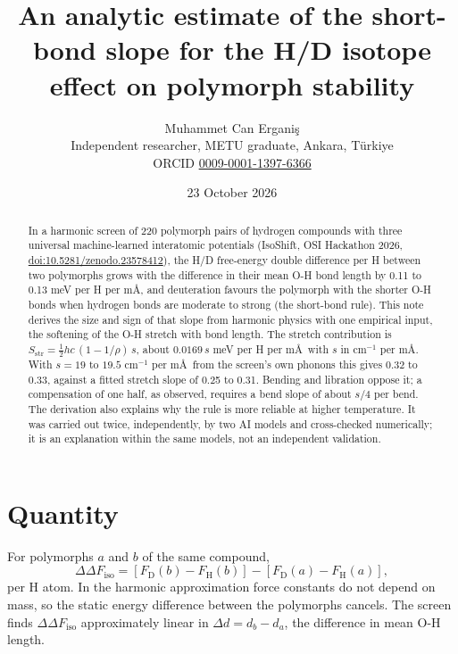 \documentclass[11pt,a4paper]{article}
\title{An analytic estimate of the short-bond slope for the H/D isotope effect on polymorph stability}
\author{Muhammet Can Ergani\c{s}\\
\small Independent researcher, METU graduate, Ankara, T\"urkiye\\
\small ORCID \href{https://orcid.org/0009-0001-1397-6366}{0009-0001-1397-6366}}
\date{23 October 2026}
\begin{document}
\maketitle

\begin{abstract}
In a harmonic screen of 220 polymorph pairs of hydrogen compounds with three universal machine-learned interatomic potentials (IsoShift, OSI Hackathon 2026, \href{https://doi.org/10.5281/zenodo.23578412}{doi:10.5281/zenodo.23578412}), the H/D free-energy double difference per H between two polymorphs grows with the difference in their mean O-H bond length by 0.11 to 0.13 meV per H per m\AA, and deuteration favours the polymorph with the shorter O-H bonds when hydrogen bonds are moderate to strong (the short-bond rule). This note derives the size and sign of that slope from harmonic physics with one empirical input, the softening of the O-H stretch with bond length. The stretch contribution is $S_{\mathrm{str}} = \tfrac{1}{2}hc\,(1-1/\rho)\,s$, about $0.0169\,s$ meV per H per m\AA\ with $s$ in cm$^{-1}$ per m\AA. With $s = 19$ to $19.5$ cm$^{-1}$ per m\AA\ from the screen's own phonons this gives 0.32 to 0.33, against a fitted stretch slope of 0.25 to 0.31. Bending and libration oppose it; a compensation of one half, as observed, requires a bend slope of about $s/4$ per bend. The derivation also explains why the rule is more reliable at higher temperature. It was carried out twice, independently, by two AI models and cross-checked numerically; it is an explanation within the same models, not an independent validation.
\end{abstract}

\section{Quantity}
For polymorphs $a$ and $b$ of the same compound,
\begin{equation}
\Delta\Delta F_{\mathrm{iso}} = [F_{\mathrm D}(b) - F_{\mathrm H}(b)] - [F_{\mathrm D}(a) - F_{\mathrm H}(a)],
\end{equation}
per H atom. In the harmonic approximation force constants do not depend on mass, so the static energy difference between the polymorphs cancels. The screen finds $\Delta\Delta F_{\mathrm{iso}}$ approximately linear in $\Delta d = d_b - d_a$, the difference in mean O-H length.
\end{document}
